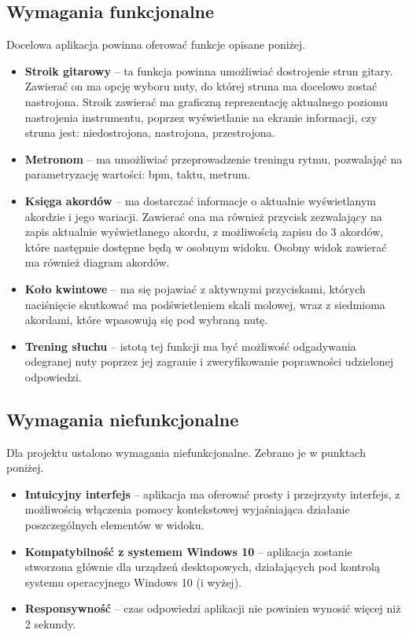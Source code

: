 \subsection{Wymagania funkcjonalne}
Docelowa aplikacja powinna oferować funkcje opisane poniżej.
\begin{itemize}
\item \textbf{Stroik gitarowy} -- ta funkcja powinna umożliwiać dostrojenie strun gitary. Zawierać on ma opcję wyboru nuty, do której struna ma docelowo zostać nastrojona. Stroik zawierać ma graficzną reprezentację aktualnego poziomu nastrojenia instrumentu, poprzez wyświetlanie na ekranie informacji, czy struna jest: niedostrojona, nastrojona, przestrojona.
\item \textbf{Metronom} -- ma umożliwiać przeprowadzenie treningu rytmu, pozwalająć na parametryzację wartości: bpm, taktu, metrum.
\item \textbf{Księga akordów} -- ma dostarczać informacje o aktualnie wyświetlanym akordzie i jego wariacji. Zawierać ona ma również przycisk zezwalający na zapis aktualnie wyświetlanego akordu, z możliwością zapisu do 3 akordów, które następnie dostępne będą w osobnym widoku. Osobny widok zawierać ma również diagram akordów.
\item \textbf{Koło kwintowe} -- ma się pojawiać z aktywnymi przyciskami, których naciśnięcie skutkować ma podświetleniem skali molowej, wraz z siedmioma akordami, które wpasowują się pod wybraną nutę.
\item \textbf{Trening słuchu} -- istotą tej funkcji ma być możliwość odgadywania odegranej nuty poprzez jej zagranie i zweryfikowanie poprawności udzielonej odpowiedzi. 
\end{itemize}

\subsection{Wymagania niefunkcjonalne}

Dla projektu ustalono wymagania niefunkcjonalne. Zebrano je w punktach poniżej.
\begin{itemize}
\item \textbf{Intuicyjny interfejs} -- aplikacja ma oferować prosty i przejrzysty interfejs, z możliwością włączenia pomocy kontekstowej wyjaśniająca działanie poszczególnych elementów w widoku.
\item \textbf{Kompatybilność z systemem Windows 10} --  aplikacja zostanie stworzona głównie dla urządzeń desktopowych, działających pod kontrolą systemu operacyjnego Windows 10 (i wyżej).
\item \textbf{Responsywność} -- czas odpowiedzi aplikacji nie powinien wynosić więcej niż 2 sekundy. 
\end{itemize}


